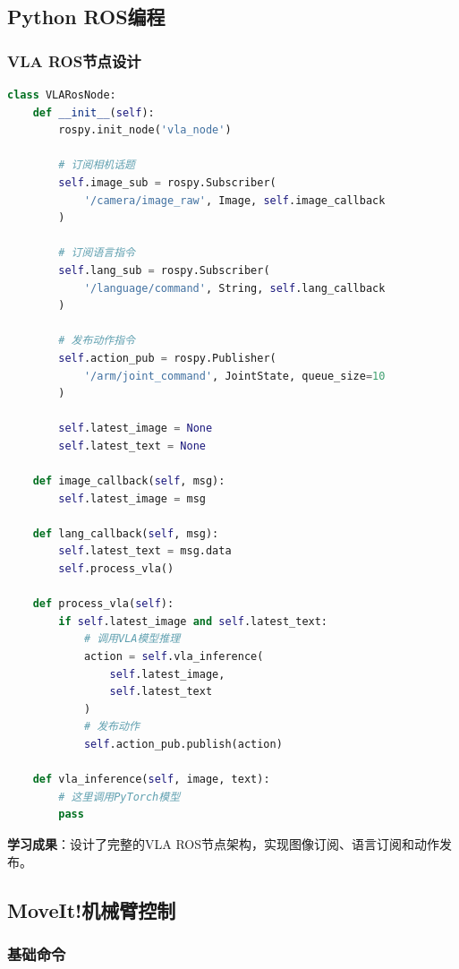 \documentclass[12pt,a4paper]{article}
\begin{document}
\subsection{Python ROS编程}

\subsubsection{VLA ROS节点设计}

\begin{lstlisting}[language=Python]
class VLARosNode:
    def __init__(self):
        rospy.init_node('vla_node')
        
        # 订阅相机话题
        self.image_sub = rospy.Subscriber(
            '/camera/image_raw', Image, self.image_callback
        )
        
        # 订阅语言指令
        self.lang_sub = rospy.Subscriber(
            '/language/command', String, self.lang_callback
        )
        
        # 发布动作指令
        self.action_pub = rospy.Publisher(
            '/arm/joint_command', JointState, queue_size=10
        )
        
        self.latest_image = None
        self.latest_text = None
    
    def image_callback(self, msg):
        self.latest_image = msg
    
    def lang_callback(self, msg):
        self.latest_text = msg.data
        self.process_vla()
    
    def process_vla(self):
        if self.latest_image and self.latest_text:
            # 调用VLA模型推理
            action = self.vla_inference(
                self.latest_image, 
                self.latest_text
            )
            # 发布动作
            self.action_pub.publish(action)
    
    def vla_inference(self, image, text):
        # 这里调用PyTorch模型
        pass
\end{lstlisting}

\textbf{学习成果}：设计了完整的VLA ROS节点架构，实现图像订阅、语言订阅和动作发布。

\subsection{MoveIt!机械臂控制}

\subsubsection{基础命令}
\end{document}
